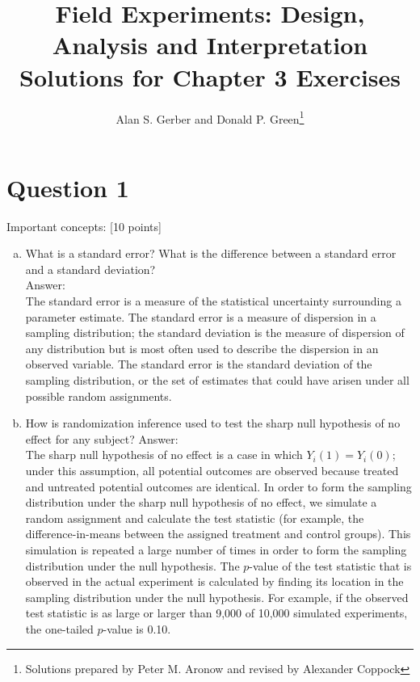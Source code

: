 \documentclass[11pt,notitlepage]{article}\usepackage[]{graphicx}\usepackage[]{color}
\begin{document}
\title{Field Experiments: Design, Analysis and Interpretation \\
Solutions for Chapter 3 Exercises}
\author{Alan S. Gerber and Donald P. Green\footnote{Solutions prepared by Peter M. Aronow and revised by Alexander Coppock}}
\date{\vspace{-5ex}}
\maketitle

\section*{Question 1}
Important concepts: [10 points]
\begin{enumerate}[a)]
\item What is a standard error?  What is the difference between a standard error and a standard deviation?\\
Answer:\\
The standard error is a measure of the statistical uncertainty surrounding a parameter estimate. The standard error is a measure of dispersion in a sampling distribution; the standard deviation is the measure of dispersion of any distribution but is most often used to describe the dispersion in an observed variable. The standard error is the standard deviation of the sampling distribution, or the set of estimates that could have arisen under all possible random assignments. 
\item How is randomization inference used to test the sharp null hypothesis of no effect for any subject? 
Answer:\\ 
The sharp null hypothesis of no effect is a case in which $Y_i (1)= Y_i (0)$; under this assumption, all potential outcomes are observed because treated and untreated potential outcomes are identical.  In order to form the sampling distribution under the sharp null hypothesis of no effect, we simulate a random assignment and calculate the test statistic (for example, the difference-in-means between the assigned treatment and control groups). This simulation is repeated a large number of times in order to form the sampling distribution under the null hypothesis.  The $p$-value of the test statistic that is observed in the actual experiment is calculated by finding its location in the sampling distribution under the null hypothesis. For example, if the observed test statistic is as large or larger than 9,000 of 10,000 simulated experiments, the one-tailed $p$-value is 0.10.

\end{enumerate}
\end{document}
